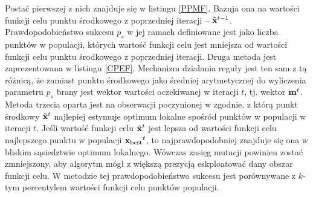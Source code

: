     Postać pierwszej z nich znajduje się w listingu \ref{PPMF}. Bazuja ona na wartości funkcji celu punktu środkowego z poprzedniej iteracji -- ${\bf \tilde x}^{t-1}$. Prawdopodobieństwo sukcesu $p_s$ w jej ramach definiowane jest jako liczba punktów w populacji, których wartość funkcji celu jest mniejsza od wartości funkcji celu punktu środkowego z poprzedniej iteracji.
    Druga metoda jest zaprezentowana w listingu \ref{CPEF}. Mechanizm działania reguły jest ten sam z tą różnicą, że zamiast punktu środkowego jako średniej arytmetycznej do wyliczenia parametru $p_s$ brany jest wektor wartości oczekiwanej
w iteracji $t$, tj. wektor ${\bf m}^t$.
  Metoda trzecia oparta jest na obserwacji poczynionej w \cite{Arabas17} zgodnie, z którą punkt środkowy ${\bf \tilde x}^{t}$ najlepiej estymuje optimum lokalne
  spośród punktów w populacji w iteracji $t$.
  Jeśli wartość funkcji celu ${\bf \tilde x}^{t}$ jest lepsza od wartości funkcji celu najlepszego punktu w populacji ${\bf x_{\text{best}}}^{t}$, to najprawdopodobniej znajduje się ona w bliskim sąsiedztwie optimum lokalnego. Wówczas zasięg mutacji powinien zostać zmniejszony, aby algorytm mógł z większą prezycją eskploatować dany obszar funkcji celu. W metodzie tej prawdopodobieństwo sukcesu jest porównywane z $k$-tym percentylem wartości funkcji celu punktów populacji.
